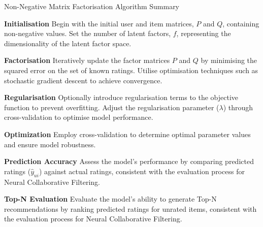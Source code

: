 \begin{algorithm}
    \caption{Non-Negative Matrix Factorisation Algorithm Summary}
    \begin{algorithmic}[1]
      \State \textbf{Initialisation}
       \newline \quad Begin with the initial user and item matrices, $P$ and $Q$, containing non-negative values.
       \newline \quad Set the number of latent factors, $f$, representing the dimensionality of the latent factor space.
    
      \State \textbf{Factorisation}
       \newline \quad Iteratively update the factor matrices $P$ and $Q$ by minimising the squared error on the set of known ratings.
       \newline \quad Utilise optimisation techniques such as stochastic gradient descent to achieve convergence.
    
      \State \textbf{Regularisation}
       \newline \quad Optionally introduce regularisation terms to the objective function to prevent overfitting.
       \newline \quad Adjust the regularisation parameter ($\lambda$) through cross-validation to optimise model performance.
        
      \State \textbf{Optimization}
       \newline \quad Employ cross-validation to determine optimal parameter values and ensure model robustness.
    
      \State \textbf{Prediction Accuracy}
       \newline \quad Assess the model's performance by comparing predicted ratings ($\hat{y}_{u i}$) against actual ratings, consistent with the evaluation process for Neural Collaborative Filtering.
    
      \State \textbf{Top-N Evaluation}
       \newline \quad Evaluate the model's ability to generate Top-N recommendations by ranking predicted ratings for unrated items, consistent with the evaluation process for Neural Collaborative Filtering.
    \end{algorithmic}
    \end{algorithm}
    
